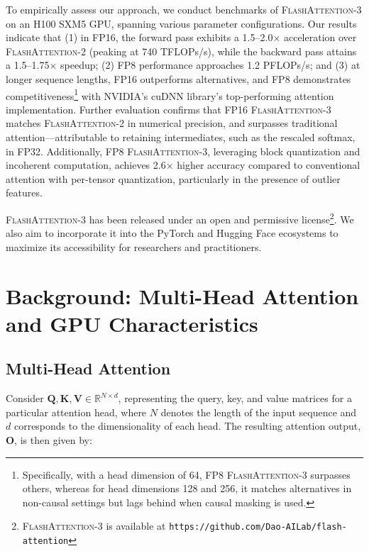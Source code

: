 To empirically assess our approach, we conduct benchmarks of \textsc{FlashAttention-3} on an H100 SXM5 GPU, spanning various parameter configurations. Our results indicate that (1) in FP16, the forward pass exhibits a 1.5–2.0$\times$ acceleration over \textsc{FlashAttention-2} (peaking at 740 TFLOPs/s), while the backward pass attains a 1.5–1.75$\times$ speedup; (2) FP8 performance approaches 1.2 PFLOPs/s; and (3) at longer sequence lengths, FP16 outperforms alternatives, and FP8 demonstrates competitiveness\footnote{Specifically, with a head dimension of 64, FP8 \textsc{FlashAttention-3} surpasses others, whereas for head dimensions 128 and 256, it matches alternatives in non-causal settings but lags behind when causal masking is used.} with NVIDIA’s cuDNN library’s top-performing attention implementation. Further evaluation confirms that FP16 \textsc{FlashAttention-3} matches \textsc{FlashAttention-2} in numerical precision, and surpasses traditional attention—attributable to retaining intermediates, such as the rescaled softmax, in FP32. Additionally, FP8 \textsc{FlashAttention-3}, leveraging block quantization and incoherent computation, achieves 2.6$\times$ higher accuracy compared to conventional attention with per-tensor quantization, particularly in the presence of outlier features.

\textsc{FlashAttention-3} has been released under an open and permissive license\footnote{\textsc{FlashAttention-3}
  is available at \texttt{https://github.com/Dao-AILab/flash-attention}}. We also aim to incorporate it into the PyTorch and Hugging Face ecosystems to maximize its accessibility for researchers and practitioners.

\section{Background: Multi-Head Attention and GPU Characteristics}
\label{sec:background}

\subsection{Multi-Head Attention}
\label{subsec:multi_head_attn}

Consider $\mathbf{Q}, \mathbf{K}, \mathbf{V} \in \mathbb{R}^{N \times d}$, representing the query, key, and value matrices for a particular attention head, where $N$ denotes the length of the input sequence and $d$ corresponds to the dimensionality of each head. The resulting attention output, $\mathbf{O}$, is then given by:

